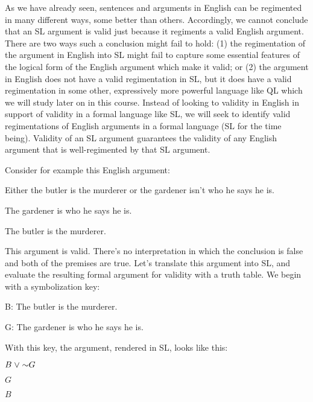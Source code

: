 As we have already seen, sentences and arguments in English can be regimented in many different ways, some better than others.
Accordingly, we cannot conclude that an SL argument is valid just because it regiments a valid English argument.
There are two ways such a conclusion might fail to hold: (1) the regimentation of the argument in English into SL might fail to capture some essential features of the logical form of the English argument which make it valid; or (2) the argument in English does not have a valid regimentation in SL, but it does have a valid regimentation in some other, expressively more powerful language like QL which we will study later on in this course.
Instead of looking to validity in English in support of validity in a formal language like SL, we will seek to identify valid regimentations of English arguments in a formal language (SL for the time being).
Validity of an SL argument guarantees the validity of any English argument that is well-regimented by that SL argument.

Consider for example this English argument:

\begin{earg}
\item Either the butler is the murderer or the gardener isn't who he says he is.
\item The gardener is who he says he is.
\item[\therefore] The butler is the murderer.
\end{earg}

This argument is valid. There's no interpretation in which the conclusion is false and both of the premises are true.
Let's translate this argument into SL, and evaluate the resulting formal argument for validity with a truth table.
We begin with a symbolization key:

\begin{ekey}
\item[B:] The butler is the murderer.
\item[G:] The gardener is who he says he is.
\end{ekey}

With this key, the argument, rendered in SL, looks like this:

\begin{earg}
\item $B\eor\enot G$
\item $G$
\item[\therefore] $B$
\end{earg}

